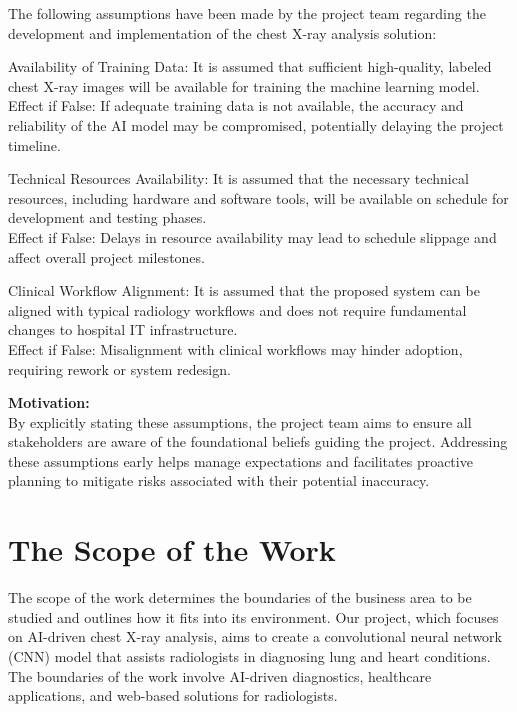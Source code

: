 \documentclass[12pt]{article}
\begin{document}
The following assumptions have been made by the project team regarding the development and implementation of the chest X-ray analysis solution:

Availability of Training Data: It is assumed that sufficient high-quality, labeled chest X-ray images will be available for training the machine learning model.\\
Effect if False: If adequate training data is not available, the accuracy and reliability of the AI model may be compromised, potentially delaying the project timeline.

Technical Resources Availability: It is assumed that the necessary technical resources, including hardware and software tools, will be available on schedule for development and testing phases.\\
Effect if False: Delays in resource availability may lead to schedule slippage and affect overall project milestones.

Clinical Workflow Alignment: It is assumed that the proposed system can be aligned with typical radiology workflows and does not require fundamental changes to hospital IT infrastructure.\\
Effect if False: Misalignment with clinical workflows may hinder adoption, requiring rework or system redesign.

\textbf{Motivation:}\\
By explicitly stating these assumptions, the project team aims to ensure all stakeholders are aware of the foundational beliefs guiding the project. Addressing these assumptions early helps manage expectations and facilitates proactive planning to mitigate risks associated with their potential inaccuracy.


\section{The Scope of the Work}

The scope of the work determines the boundaries of the business area to be studied and outlines how it fits into its environment. Our project, which focuses on AI-driven chest X-ray analysis, aims to create a convolutional neural network (CNN) model that assists radiologists in diagnosing lung and heart conditions. The boundaries of the work involve AI-driven diagnostics, healthcare applications, and web-based solutions for radiologists.
\end{document}
